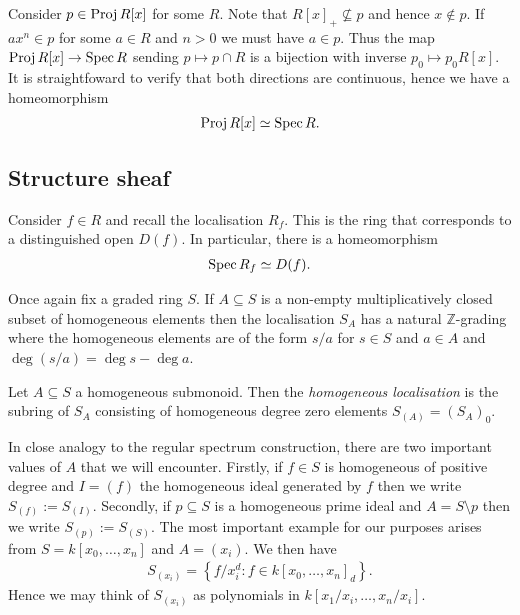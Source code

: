 \documentclass{article}
\begin{document}
\begin{example}\label{ex:proj0_homeo}
  Consider $p\in\operatorname{Proj} R[x]$ for some $R$.
  Note that $R[x]_+\not\subseteq p$ and
  hence $x\not\in p$. If $ax^n\in p$ for some $a\in R$ and $n>0$
  we must have $a\in p$. Thus the map $\operatorname{Proj} R[x] \to \operatorname{Spec} R$
  sending $p \mapsto p \cap R$ is a bijection with inverse
  $p_0 \mapsto p_0 R[x]$. It is straightfoward to verify that both
  directions are continuous, hence we have a homeomorphism
  \begin{align*}
    \operatorname{Proj} R[x] \simeq \operatorname{Spec} R.
  \end{align*}
\end{example}

\subsection{Structure sheaf}


Consider $f\in R$ and recall the localisation $R_f$. This is the ring
that corresponds to a distinguished open $D(f)$. In particular,
there is a homeomorphism
\begin{align*}
  \operatorname{Spec} R_f \simeq D(f).
\end{align*}

Once again fix a graded ring $S$.
If $A\subseteq S$ is a non-empty multiplicatively closed subset
of homogeneous elements then the localisation $S_A$ has a
natural $\mathbb{Z}$-grading where the homogeneous elements
are of the form $s/a$ for $s\in S$ and $a\in A$ and
$\deg(s/a) = \deg s - \deg a$.

\begin{definition}
  Let $A\subseteq S$ a homogeneous submonoid. Then the \emph{homogeneous
  localisation} is the subring of $S_A$ consisting of homogeneous degree zero
  elements $S_{(A)} = (S_A)_0$.
\end{definition}

In close analogy to the regular spectrum construction, there are two important
values of $A$ that we will encounter. Firstly, if $f\in S$ is homogeneous of
positive degree and $I=(f)$ the homogeneous ideal generated by $f$ then we
write $S_{(f)}:=S_{(I)}$. Secondly, if $p\subseteq S$ is a homogeneous prime
ideal and $A=S\setminus p$ then we write $S_{(p)} := S_{(S)}$.
The most important example for our purposes arises from
$S = k[x_0,\ldots,x_n]$ and $A=(x_i)$. We then have
\begin{align*}
  S_{(x_i)} = \left\lbrace{f / x_i^d : f\in k[x_0,\ldots,x_n]_d}\right\rbrace.
\end{align*}
Hence we may think of $S_{(x_i)}$ as
polynomials in $k[x_1/x_i,\ldots,x_n/x_i]$.
\end{document}
